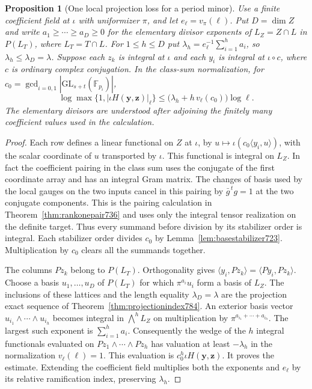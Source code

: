 \documentclass[a4paper,11pt]{article}
\newtheorem{proposition}{Proposition}[section]
\theoremstyle{definition}
\theoremstyle{remark}
\numberwithin{equation}{section}
\begin{document}
\begin{proposition}[One local projection loss for a period minor]
\leavevmode\label{prop:extprojection804}
Use a finite coefficient field at \(\iota\) with uniformizer
\(\pi\), and let \(e_\ell=v_\pi(\ell)\). Put \(D=\dim Z\) and
write \(a_1\ge\cdots\ge a_D\ge0\) for the elementary divisor
exponents of \(L_Z=Z\cap L\) in \(P(L_T)\), where \(L_T=T\cap L\).
For \(1\le h\le D\) put
\(\lambda_h=e_\ell^{-1}\sum_{i=1}^h a_i\), so
\(\lambda_h\le\lambda_D=\lambda\). Suppose each \(z_k\)
is integral at \(\iota\) and each \(y_i\) is integral at
\(\iota\circ c\), where \(c\) is ordinary complex conjugation.
In the class-sum normalization, for
\(c_0=\gcd_{i=0,1}|\mathrm{GL}_{s+t}(\mathbb F_{p_i})|\),
\[
      \log\max\{1,|\iota H(\mathbf y,\mathbf z)|_\ell\}
         \le \bigl(\lambda_h+h\,v_\ell(c_0)\bigr)\log\ell .
\]
The elementary divisors are understood after adjoining the
finitely many coefficient values used in the calculation.
\end{proposition}
\begin{proof}
Each row defines a linear functional on \(Z\) at \(\iota\),
by \(u\mapsto\iota(c_0\langle y_i,u\rangle)\), with the scalar
coordinate of \(u\) transported by \(\iota\). This functional
is integral on \(L_Z\). In fact the coefficient pairing in the
class sum uses the conjugate of the first coordinate array and
has an integral Gram matrix. The changes of basis used by the
local gauges on the two inputs cancel in this pairing by
\(\bar g^{\,t}g=1\) at the two conjugate components. This is
the pairing calculation in Theorem~\ref{thm:rankonepair736}
and uses only the integral tensor realization on the definite
target. Thus every summand before division by its stabilizer
order is integral. Each stabilizer order divides \(c_0\) by
Lemma~\ref{lem:basestabilizer723}. Multiplication by \(c_0\)
clears all the summands together.

The columns \(Pz_k\) belong to \(P(L_T)\). Orthogonality gives
\(\langle y_i,Pz_k\rangle=\langle Py_i,Pz_k\rangle\).
Choose a basis \(u_1,\ldots,u_D\) of \(P(L_T)\) for which
\(\pi^{a_i}u_i\) form a basis of \(L_Z\). The inclusions of
these lattices and the length equality \(\lambda_D=\lambda\)
are the projection exact sequence of
Theorem~\ref{thm:projectionindex784}. An exterior basis vector
\(u_{i_1}\wedge\cdots\wedge u_{i_h}\) becomes integral in
\(\bigwedge^h L_Z\) on multiplication by
\(\pi^{a_{i_1}+\cdots+a_{i_h}}\). The largest such exponent
is \(\sum_{i=1}^h a_i\). Consequently the wedge of the \(h\)
integral functionals evaluated on
\(Pz_1\wedge\cdots\wedge Pz_h\) has valuation at least
\(-\lambda_h\) in the normalization \(v_\ell(\ell)=1\).
This evaluation is \(c_0^h\iota H(\mathbf y,\mathbf z)\).
It proves the estimate. Extending the coefficient field
multiplies both the exponents and \(e_\ell\) by its relative
ramification index, preserving \(\lambda_h\).
\end{proof}
\end{document}
